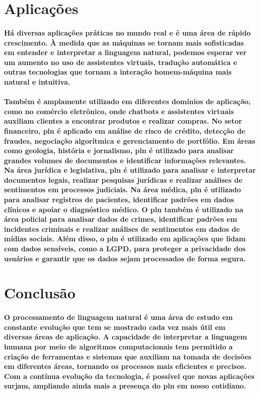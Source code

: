\documentclass{article}
\begin{document}
\section{Aplicações}
\paragraph{Há diversas aplicações práticas no mundo real e é uma área de rápido crescimento.
À medida que as máquinas se tornam mais sofisticadas em entender e interpretar a
linguagem natural, podemos esperar ver um aumento no uso de assistentes virtuais,
tradução automática e outras tecnologias que tornam a interação homem-máquina
mais natural e intuitiva.}

\paragraph{Também é amplamente utilizado em diferentes domínios de aplicação, como no
comércio eletrônico, onde chatbots e assistentes virtuais auxiliam clientes a
encontrar produtos e realizar compras. No setor financeiro, pln é aplicado em análise
de risco de crédito, detecção de fraudes, negociação algorítmica e gerenciamento de portfólio. Em áreas como geologia, história e jornalismo, pln é utilizado para analisar
grandes volumes de documentos e identificar informações relevantes. Na área jurídica e legislativa, pln é utilizado para analisar e interpretar documentos legais,
realizar pesquisas jurídicas e realizar análises de sentimentos em processos
judiciais. Na área médica, pln é utilizado para analisar registros de pacientes,
identificar padrões em dados clínicos e apoiar o diagnóstico médico. O pln também é
utilizado na área policial para analisar dados de crimes, identificar padrões em
incidentes criminais e realizar análises de sentimentos em dados de mídias sociais.
Além disso, o pln é utilizado em aplicações que lidam com dados sensíveis, como a
LGPD, para proteger a privacidade dos usuários e garantir que os dados sejam
processados de forma segura.}

\section{Conclusão}
\paragraph{O processamento de linguagem natural é uma área de estudo em constante
evolução que tem se mostrado cada vez mais útil em diversas áreas de aplicação. A
capacidade de interpretar a linguagem humana por meio de algoritmos
computacionais tem permitido a criação de ferramentas e sistemas que auxiliam na
tomada de decisões em diferentes áreas, tornando os processos mais eficientes e
precisos. Com a contínua evolução da tecnologia, é possível que novas aplicações
surjam, ampliando ainda mais a presença do pln em nosso cotidiano.}
\end{document}
